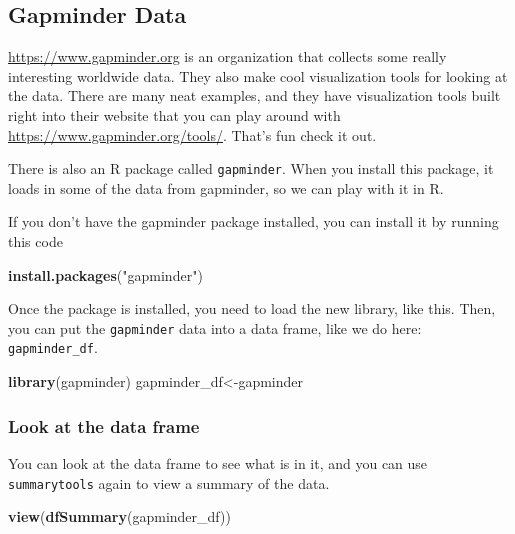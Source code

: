 \documentclass[
]{book}
\newenvironment{Shaded}{\begin{snugshade}}{\end{snugshade}}
\newcommand{\FunctionTok}[1]{\textcolor[rgb]{0.13,0.29,0.53}{\textbf{#1}}}
\newcommand{\NormalTok}[1]{#1}
\newcommand{\OtherTok}[1]{\textcolor[rgb]{0.56,0.35,0.01}{#1}}
\newcommand{\StringTok}[1]{\textcolor[rgb]{0.31,0.60,0.02}{#1}}
\begin{document}
\hypertarget{gapminder-data}{%
\subsection{Gapminder Data}\label{gapminder-data}}

\url{https://www.gapminder.org} is an organization that collects some really interesting worldwide data. They also make cool visualization tools for looking at the data. There are many neat examples, and they have visualization tools built right into their website that you can play around with \url{https://www.gapminder.org/tools/}. That's fun check it out.

There is also an R package called \texttt{gapminder}. When you install this package, it loads in some of the data from gapminder, so we can play with it in R.

If you don't have the gapminder package installed, you can install it by running this code

\begin{Shaded}
\begin{Highlighting}[]
\FunctionTok{install.packages}\NormalTok{(}\StringTok{"gapminder"}\NormalTok{)}
\end{Highlighting}
\end{Shaded}

Once the package is installed, you need to load the new library, like this. Then, you can put the \texttt{gapminder} data into a data frame, like we do here: \texttt{gapminder\_df}.

\begin{Shaded}
\begin{Highlighting}[]
\FunctionTok{library}\NormalTok{(gapminder)}
\NormalTok{gapminder\_df}\OtherTok{\textless{}{-}}\NormalTok{gapminder}
\end{Highlighting}
\end{Shaded}

\hypertarget{look-at-the-data-frame}{%
\subsubsection{Look at the data frame}\label{look-at-the-data-frame}}

You can look at the data frame to see what is in it, and you can use \texttt{summarytools} again to view a summary of the data.

\begin{Shaded}
\begin{Highlighting}[]
\FunctionTok{view}\NormalTok{(}\FunctionTok{dfSummary}\NormalTok{(gapminder\_df))}
\end{Highlighting}
\end{Shaded}
\end{document}
